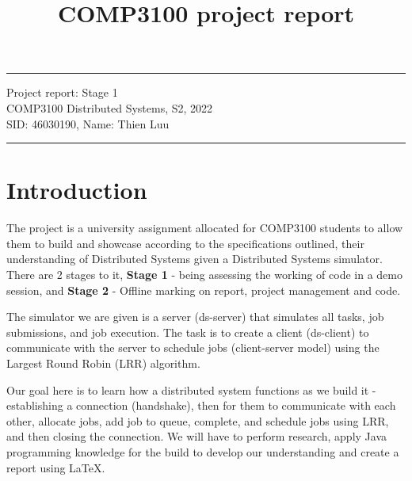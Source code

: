\documentclass[a4paper]{article} %
\begin{document}

\title{COMP3100 project report} %
\fancyhead[C]{}
\hrule \medskip %
\begin{minipage}{1\textwidth} %
\centering 
\large %
Project report: Stage 1\\ %
COMP3100 Distributed Systems, S2, 2022\\
\normalsize %
SID: 46030190, Name: Thien Luu \cite{code}
\end{minipage}
\medskip\hrule %
\bigskip



\section{Introduction}
The project is a university assignment allocated for COMP3100 students to allow them to build and showcase according to the specifications outlined, their understanding of Distributed Systems given a Distributed Systems simulator. There are 2 stages to it, \textbf{Stage 1} - being assessing the working of code in a demo session, and \textbf{Stage 2} - Offline marking on report, project management and code.
\bigskip

The simulator we are given is a server (ds-server) that simulates all tasks, job submissions, and job execution. The task is to create a client (ds-client) to communicate with the server to schedule jobs (client-server model) using the Largest Round Robin (LRR) algorithm.
\bigskip

Our goal here is to learn how a distributed system functions as we build it - establishing a connection (handshake), then for them to communicate with each other, allocate jobs, add job to queue, complete, and schedule jobs using LRR, and then closing the connection. We will have to perform research, apply Java programming knowledge for the build to develop our understanding and create a report using \LaTeX.
\end{document}
